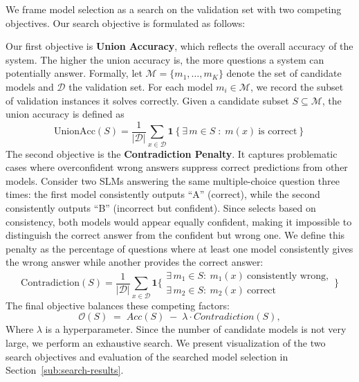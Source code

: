 We frame model selection as a search on the validation set with two competing objectives. Our search objective is formulated as follows:


% 

Our first objective is \textbf{Union Accuracy}, which reflects the overall accuracy 
of the system. The higher the union accuracy is, the more questions a system can potentially answer. Formally, let 
$\mathcal{M} = \{m_1, \ldots, m_K\}$ denote the set of candidate models and 
$\mathcal{D}$ the validation set. For each model $m_i \in \mathcal{M}$, we 
record the subset of validation instances it solves correctly. Given a candidate 
subset $S \subseteq \mathcal{M}$, the union accuracy is defined as
% 
\begin{equation*}
\mathrm{UnionAcc}(S) =
\frac{1}{|\mathcal{D}|}
\sum_{x \in \mathcal{D}}
\mathbf{1}\!\left\{ \exists\, m \in S \;:\; m(x)\ \text{is correct} \right\}
\end{equation*}
% 
% 
% 
% 
% 
% 
The second objective is the \textbf{Contradiction Penalty}. It captures problematic cases where overconfident wrong answers suppress correct predictions from other models. Consider two SLMs answering the same multiple-choice question three times: the first model consistently outputs ``A'' (correct), while the second consistently outputs ``B'' (incorrect but confident). Since \NAME{}{} selects based on consistency, both models would appear equally confident, making it impossible to distinguish the correct answer from the confident but wrong one. We define this penalty as the percentage of questions where at least one model consistently gives the wrong answer while another provides the correct answer:
% 
\begin{equation*}
\mathrm{Contradiction}(S) 
= \frac{1}{|\mathcal{D}|}
\sum_{x \in \mathcal{D}}
\mathbf{1}\!\Bigg\{
   \begin{array}{l}
   \exists\, m_1 \in S:\ m_1(x)\ \text{consistently wrong}, \\[4pt]
   \exists\, m_2 \in S:\ m_2(x)\ \text{correct}
   \end{array}
\Bigg\}
\end{equation*}
% 
% 
% 
% 
% 
% 
% 
% 
The final objective balances these competing factors:
% 
\begin{equation*}
\mathcal{O}(S) \;=\; Acc(S) \;-\; \lambda \cdot Contradiction(S),
\end{equation*}
% 
% 
% 
Where $\lambda$ is a hyperparameter. Since the number of candidate models is not very large, 
we perform an exhaustive search. We present visualization of the two search objectives and evaluation of the searched model selection in Section~\ref{sub:search-results}.

